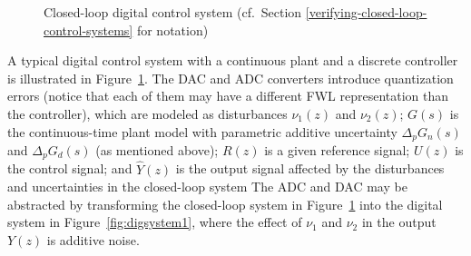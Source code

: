 \documentclass[final]{sig-alternate-05-2015}
\begin{document}
\begin{figure}[htb]
{
}
 \caption{Closed-loop digital control system (cf.~Section \ref{verifying-closed-loop-control-systems} for notation) \label{fig:sampledsystem}}
\end{figure}

A typical digital control system with a continuous plant and a discrete
controller is illustrated in Figure~\ref{fig:sampledsystem}.  The DAC and
ADC converters introduce quantization errors (notice that each of them may
have a different FWL representation than the controller), which are modeled
as disturbances $\nu_{1}(z)$ and $\nu_{2}(z)$; $G(s)$ is the continuous-time
plant model with parametric additive uncertainty $\Delta_p{G}_n(s)$ and
$\Delta_p{G}_d(s)$ (as mentioned above); $R(z)$ is a given reference signal;
$U(z)$ is the control signal; and $\hat{Y}(z)$ is the output signal affected
by the disturbances and uncertainties in the closed-loop system
%
%
%
The ADC and DAC may be abstracted by transforming the closed-loop system in
Figure~\ref{fig:sampledsystem} into the digital system in 
Figure~\ref{fig:digsystem1}, 
where 
the effect of $\nu_{1}$ and $\nu_{2}$ in the output $Y(z)$ is
additive noise.  
\end{document}
